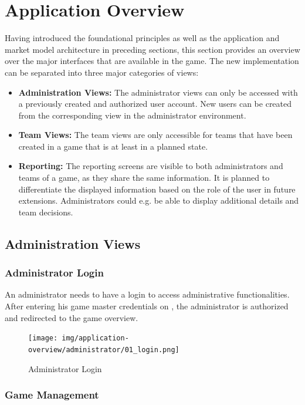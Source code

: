 \section{Application Overview}
\label{sec:application_overview}

Having introduced the foundational principles as well as the application and market model architecture in preceding sections, this section provides an overview over the major interfaces that are available in the game. The new implementation can be separated into three major categories of views:

\begin{itemize}
  \item \textbf{Administration Views:} The administrator views can only be accessed with a previously created and authorized user account. New users can be created from the corresponding view in the administrator environment.
  \item \textbf{Team Views:} The team views are only accessible for teams that have been created in a game that is at least in a planned state.
  \item \textbf{Reporting:} The reporting screens are visible to both administrators and teams of a game, as they share the same information. It is planned to differentiate the displayed information based on the role of the user in future extensions. Administrators could e.g. be able to display additional details and team decisions.
\end{itemize}

\subsection{Administration Views}
\subsubsection{Administrator Login}
An administrator needs to have a login to access administrative functionalities. After entering his game master credentials on , the administrator is authorized and redirected to the game overview.
\begin{figure}[h!]
  \centering
  \texttt{[image: img/application-overview/administrator/01\_login.png]}
  \caption{Administrator Login}
  \label{fig:admin_login}
\end{figure}

\subsubsection{Game Management}


